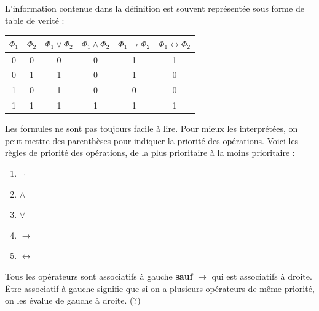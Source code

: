 L'information contenue dans la définition est souvent représentée sous forme de table de verité : 
\begin{center}
  \begin{tabular}{|c|c|c|c|c|c|}
    \hline 
    $\Phi_1$ & $\Phi_2$ & $\Phi_1\vee\Phi_2$ & $\Phi_1\wedge\Phi_2$ & $\Phi_1\rightarrow\Phi_2$ & $\Phi_1\leftrightarrow\Phi_2$ \\ 
    \hline 
    0 & 0 & 0 & 0 & 1 & 1 \\ 
    \hline 
    0 & 1 & 1 & 0 & 1 & 0 \\ 
    \hline 
    1 & 0 & 1 & 0 & 0 & 0 \\ 
    \hline 
    1 & 1 & 1 & 1 & 1 & 1 \\ 
    \hline 
  \end{tabular}
\end{center}

Les formules ne sont pas toujours facile à lire. Pour mieux les interprétées, on peut mettre des parenthèses pour indiquer la priorité des opérations. 
Voici les règles de priorité des opérations, de la plus prioritaire à la moins prioritaire : 
\begin{enumerate}
  \item $\neg$
  \item $\wedge$
  \item $\vee$
  \item $\rightarrow$
  \item $\leftrightarrow$ 
\end{enumerate}
Tous les opérateurs sont associatifs à gauche \textbf{sauf} $\rightarrow$ qui est associatifs à droite.
Être associatif à gauche signifie que si on a plusieurs opérateurs de même priorité, on les évalue de gauche à droite. (?)

